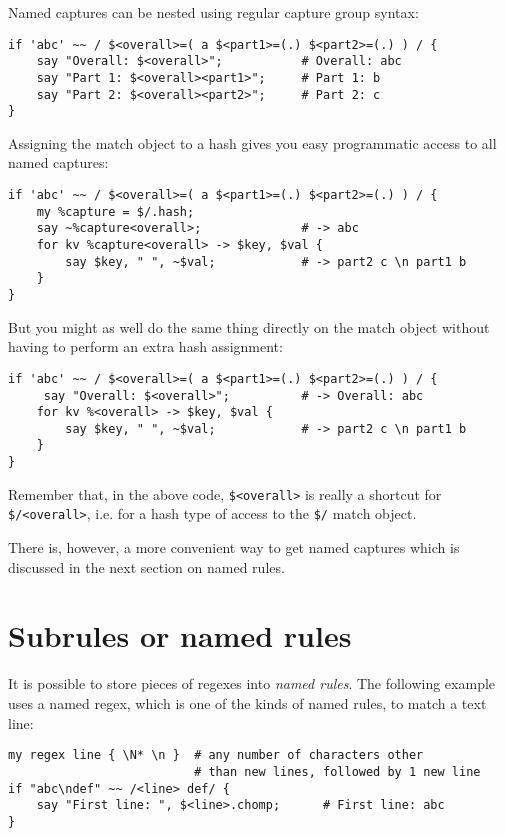 Named captures can be nested using regular capture group syntax:

\begin{verbatim}
if 'abc' ~~ / $<overall>=( a $<part1>=(.) $<part2>=(.) ) / {
    say "Overall: $<overall>";           # Overall: abc
    say "Part 1: $<overall><part1>";     # Part 1: b
    say "Part 2: $<overall><part2>";     # Part 2: c
}
\end{verbatim} 

Assigning the match object to a hash gives you easy programmatic 
access to all named captures:

\begin{verbatim}
if 'abc' ~~ / $<overall>=( a $<part1>=(.) $<part2>=(.) ) / {
    my %capture = $/.hash;    
    say ~%capture<overall>;              # -> abc
    for kv %capture<overall> -> $key, $val {
        say $key, " ", ~$val;            # -> part2 c \n part1 b
    }
}
\end{verbatim} 

But you might as well do the same thing directly on the 
match object without having to perform an extra hash 
assignment:

\begin{verbatim}
if 'abc' ~~ / $<overall>=( a $<part1>=(.) $<part2>=(.) ) / {
     say "Overall: $<overall>";          # -> Overall: abc
    for kv %<overall> -> $key, $val {
        say $key, " ", ~$val;            # -> part2 c \n part1 b
    }
}
\end{verbatim}

Remember that, in the above code, \verb'$<overall>' is 
really a shortcut for  \verb'$/<overall>', i.e. for a 
hash type of access to the \verb'$/' match object.

There is, however, a more convenient way to get named 
captures which is discussed in the next section on 
named rules.

\section{Subrules or named rules}
\label{subrules}

It is possible to store pieces of regexes into \emph{named rules}. The following example uses a named regex, which 
is one of the kinds of named rules, to match a text line:

\begin{verbatim}
my regex line { \N* \n }  # any number of characters other 
                          # than new lines, followed by 1 new line
if "abc\ndef" ~~ /<line> def/ {
    say "First line: ", $<line>.chomp;      # First line: abc
}
\end{verbatim} 

